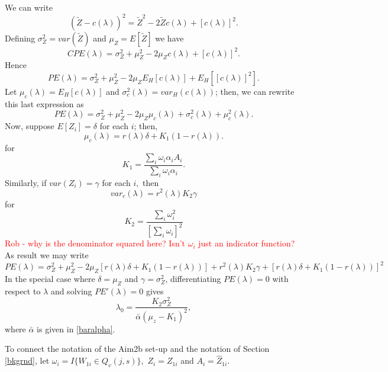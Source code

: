 \documentclass[12pt]{article}
\begin{document}
We can write
\[
(\tilde Z - c(\lambda))^2 = \tilde Z^2 - 2 \tilde Z c(\lambda) + [c(\lambda)]^2.
\]
Defining $\sigma^2_Z = var(\tilde Z)$ and $\mu_Z = E[\tilde Z]$ we have
\[
CPE(\lambda) = \sigma^2_Z + \mu^2_Z - 2 \mu_Z c(\lambda) + [c(\lambda)]^2.
\]
Hence
\[
PE(\lambda) = \sigma^2_Z + \mu^2_Z - 2 \mu_Z E_H[c(\lambda)] + E_H[[c(\lambda)]^2].
\]
Let $\mu_c(\lambda) = E_H[c(\lambda)] $ and $\sigma^2_c(\lambda) =
var_H(c(\lambda))$; then, we can rewrite this last expression as
\[
PE(\lambda) = \sigma^2_Z + \mu^2_Z - 2 \mu_Z \mu_c(\lambda) + \sigma^2_c(\lambda) + \mu^2_c(\lambda).
\]
Now, suppose $E[Z_i] = \delta$ for each $i$; then,
\[
\mu_c(\lambda) = r(\lambda) \delta+ K_1 (1-r(\lambda)).
\]
for
\[
K_1 =  \frac{ \sum_i \omega_i \alpha_i A_i}{ \sum_i \omega_i \alpha_i }.
\]
Similarly, if $var(Z_i) = \gamma$ for each $i,$ then
\[
var_c(\lambda) = r^2(\lambda) K_2 \gamma
\]
for 
\[
K_2 = \frac{ \sum_i \omega_i^2 }{[ \sum_i \omega_i]^2}
\] \textcolor{red}{Rob - why is the denominator squared here? Isn't $\omega_i$ just an indicator function?}
As result we may write
\[
PE(\lambda) = \sigma^2_Z + \mu^2_Z - 2 \mu_Z [r(\lambda) \delta + K_1 (1-r(\lambda)) ] + 
r^2(\lambda) K_2 \gamma + 
[r(\lambda) \delta + K_1 (1-r(\lambda))]^2
\]
In the special case where $\delta = \mu_Z$ and $\gamma = \sigma^2_Z$,
differentiating $PE(\lambda) = 0$ with respect to $\lambda$ and
solving $PE'(\lambda) = 0$ gives
\begin{equation}
\label{lam-opt}
\lambda_0 = \frac{K_2 \sigma^2_Z}{ \bar{\alpha} (\mu_z - K_1)^2},
\end{equation}
where $\bar \alpha$ is given in \eqref{baralpha}.



To connect the notation of the Aim2b set-up and the notation of
Section \ref{bkgrnd}, let $\omega_i = I\{ W_{1i} \in Q_{v}(j,s) \},$
$Z_i = Z_{1i}$ and $A_i = \hat Z_{1i}$. 
\end{document}
